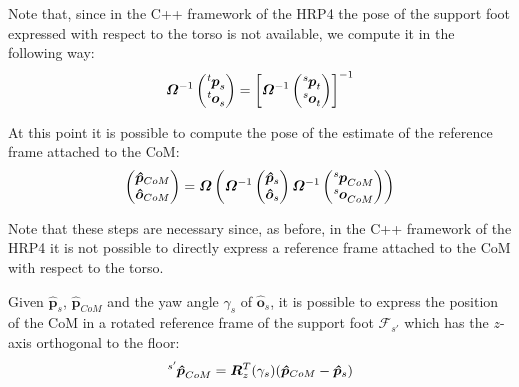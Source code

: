 \documentclass[a4paper]{article}
\begin{document}
Note that, since in the C++ framework of the HRP4 the pose of the support foot
expressed with respect to the torso is not available, we compute it in the
following way:
\begin{equation}
    \bm{\varOmega}^{-1}
    \begin{pmatrix}
        \tensor[^t]{\bm{p}}{_s} \\
        \tensor[^t]{\bm{o}}{_s}
    \end{pmatrix} =
    \left[\bm{\varOmega}^{-1}
    \begin{pmatrix}
        \tensor[^s]{\bm{p}}{_t} \\
        \tensor[^s]{\bm{o}}{_t}
    \end{pmatrix}\right]^{-1}
\end{equation}

At this point it is possible to compute the pose of the estimate of the
reference frame attached to the CoM:
\begin{equation}
    \label{eq:pose-rf-com-world}
    \begin{pmatrix}
        \bm{\hat{p}}_{CoM} \\
        \bm{\hat{o}}_{CoM}
    \end{pmatrix} = \bm{\varOmega}\left(\bm{\varOmega}^{-1}
        \begin{pmatrix}
            \bm{\hat{p}}_s \\
            \bm{\hat{o}}_s
        \end{pmatrix}\bm{\varOmega}^{-1}
        \begin{pmatrix}
            \tensor[^s]{\bm{p}}{_{CoM}} \\
            \tensor[^s]{\bm{o}}{_{CoM}}
        \end{pmatrix}
    \right)
\end{equation}

Note that these steps are necessary since, as before, in the C++ framework of the
HRP4 it is not possible to directly express a reference frame attached to the CoM with
respect to the torso.

Given $\bm{\hat{p}}_{s}$, $\bm{\hat{p}}_{CoM}$ and the yaw angle $\gamma_s$ of
$\bm{\hat{o}}_s$, it is possible to express the position of the CoM in a rotated
reference frame of the support foot $\mathcal{F}_{s'}$ which has the $z$-axis
orthogonal to the floor:
\begin{equation}
    \tensor[^{s'}]{\bm{\hat{p}}}{_{CoM}} = \bm{R}^{T}_{z}(\gamma_s)(\bm{\hat{p}}_{CoM}-\bm{\hat{p}}_{s})
\end{equation}
\end{document}
